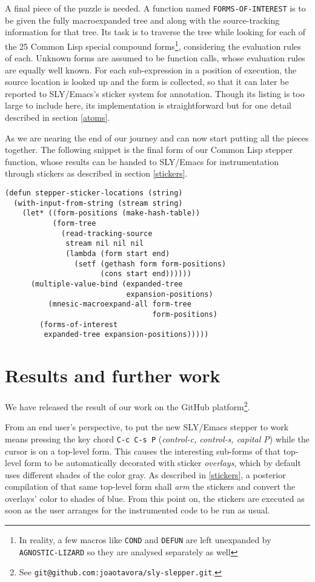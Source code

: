 \documentclass[sigconf]{acmart}
\begin{document}
A final piece of the puzzle is needed.  A function named
\texttt{FORMS-OF-INTEREST} is to be given the fully macroexpanded tree
and along with the source-tracking information for that tree.  Its
task is to traverse the tree while looking for each of the 25 Common
Lisp special compound forms\footnote{In reality, a few macros like
  \texttt{COND} and \texttt{DEFUN} are left unexpanded by
  \texttt{AGNOSTIC-LIZARD} so they are analysed separately as well},
considering the evaluation rules of each.  Unknown forms are assumed
to be function calls, whose evaluation rules are equally well known.
For each sub-expression in a position of execution, the source
location is looked up and the form is collected, so that it can later
be reported to SLY/Emacs's sticker system for annotation.  Though its
listing is too large to include here, its implementation is
straightforward but for one detail described in section \ref{atoms}.

As we are nearing the end of our journey and can now start putting all
the pieces together. The following snippet is the final form of our
Common Lisp stepper function, whose results can be handed to SLY/Emacs
for instrumentation through stickers as described in section
\ref{stickers}.

\begin{verbatim}
(defun stepper-sticker-locations (string)
  (with-input-from-string (stream string)
    (let* ((form-positions (make-hash-table))
           (form-tree
             (read-tracking-source
              stream nil nil nil
              (lambda (form start end)
                (setf (gethash form form-positions)
                      (cons start end))))))
      (multiple-value-bind (expanded-tree
                            expansion-positions)
          (mnesic-macroexpand-all form-tree
                                  form-positions)
        (forms-of-interest
         expanded-tree expansion-positions)))))
\end{verbatim}

\section{Results and further work}\label{results}

We have released the result of our work on the GitHub
platform\footnote{See
  \texttt{git@github.com:joaotavora/sly-slepper.git}.}.

From an end user's perspective, to put the new SLY/Emacs stepper to
work means pressing the key chord \texttt{C-c C-s P} (\emph{control-c,
  control-s, capital P}) while the cursor is on a top-level form.
This causes the interesting sub-forms of that top-level form to be
automatically decorated with sticker \emph{overlays}, which by default
uses different shades of the color gray.  As described in
\ref{stickers}, a posterior compilation of that same top-level form
shall \emph{arm} the stickers and convert the overlays' color to
shades of blue.  From this point on, the stickers are executed as soon
as the user arranges for the instrumented code to be run as usual.
\end{document}
